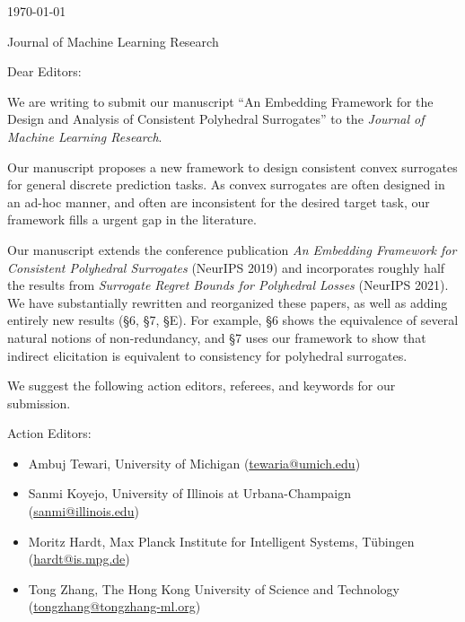 


\hfill{\today}

Journal of Machine Learning Research

\bigskip

Dear Editors:

We are writing to submit our manuscript ``An Embedding Framework for the Design and Analysis of Consistent Polyhedral Surrogates'' to the \emph{Journal of Machine Learning Research}.

Our manuscript proposes a new framework to design consistent convex surrogates for general discrete prediction tasks.
As convex surrogates are often designed in an ad-hoc manner, and often are inconsistent for the desired target task, our framework fills a urgent gap in the literature.

Our manuscript extends the conference publication \emph{An Embedding Framework for Consistent Polyhedral Surrogates} (NeurIPS 2019) and incorporates roughly half the results from \emph{Surrogate Regret Bounds for Polyhedral Losses} (NeurIPS 2021).
We have substantially rewritten and reorganized these papers, as well as adding entirely new results (\S 6, \S 7, \S E).
For example, \S 6 shows the equivalence of several natural notions of non-redundancy, and \S 7 uses our framework to show that indirect elicitation is equivalent to consistency for polyhedral surrogates.

We suggest the following action editors, referees, and keywords for our submission.

Action Editors:
\begin{itemize}
    \item Ambuj Tewari, University of Michigan (\url{tewaria@umich.edu})
    \item Sanmi Koyejo, University of Illinois at Urbana-Champaign (\url{sanmi@illinois.edu})
    \item Moritz Hardt, Max Planck Institute for Intelligent Systems, T\"ubingen (\url{hardt@is.mpg.de})
    \item Tong Zhang,  The Hong Kong University of Science and Technology (\url{tongzhang@tongzhang-ml.org})
\end{itemize}

